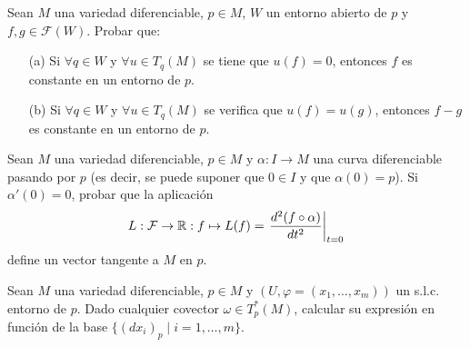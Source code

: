 \documentclass[twoside]{article}
\begin{document}
\begin{ejercicio}{2}
Sean $M$ una variedad diferenciable, $p \in M$, $W$ un entorno abierto de $p$ y
$f,g \in \mathcal{F}(W)$. Probar que:

\begin{itemize}
\item[(a)] Si $\forall q \in W$ y $\forall u \in  T_q(M)$ se tiene que $u(f) = 0$, entonces $f$ es constante
en un entorno de $p$.
\item[(b)] Si $\forall q \in W$ y $\forall u \in T_q(M)$ se verifica que $u(f) = u(g)$, entonces $f - g$ es
constante en un entorno de $p$.
\end{itemize}
\end{ejercicio}
\begin{solucion}

\end{solucion}

\newpage

\begin{ejercicio}{3}
Sean $M$ una variedad diferenciable, $p \in M$ y $\alpha : I \to M$ una curva diferenciable
pasando por $p$ (es decir, se puede suponer que $0 \in I$ y que $\alpha(0) = p$).
Si $\alpha'(0) = 0$, probar que la aplicación
$$L:\mathcal{F}\to\mathbb{R}:f\mapsto L(f)=\left.\frac{d^2(f\circ\alpha)}{dt^2}\right|_{t=0}$$
define un vector tangente a $M$ en $p$.
\end{ejercicio}
\begin{solucion}

\end{solucion}

\newpage

\begin{ejercicio}{4}
Sean $M$ una variedad diferenciable, $p \in M$ y $(U, \varphi = (x_1, \dots , x_m))$ un s.l.c.
entorno de $p$. Dado cualquier covector $\omega \in T^*_p (M)$, calcular su expresión en
función de la base $\{(dx_i)_p \mid i = 1, \dots ,m\}$.
\end{ejercicio}
\begin{solucion}

\end{solucion}
\end{document}
